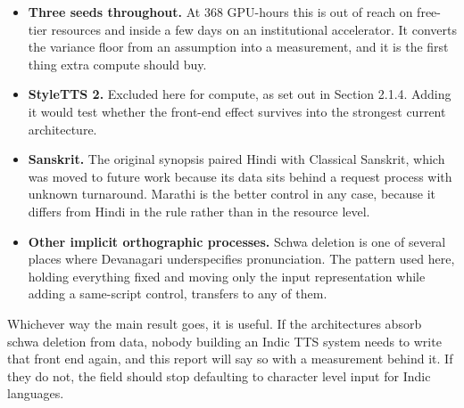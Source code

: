 \documentclass[12pt,a4paper]{article}
\begin{document}
\begin{itemize}[leftmargin=1.6em,itemsep=2pt,topsep=3pt]
  \item \textbf{Three seeds throughout.} At 368 GPU-hours this is out of reach on free-tier resources and inside a few days on an institutional accelerator. It converts the variance floor from an assumption into a measurement, and it is the first thing extra compute should buy.
  \item \textbf{StyleTTS 2.} Excluded here for compute, as set out in Section 2.1.4. Adding it would test whether the front-end effect survives into the strongest current architecture.
  \item \textbf{Sanskrit.} The original synopsis paired Hindi with Classical Sanskrit, which was moved to future work because its data sits behind a request process with unknown turnaround. Marathi is the better control in any case, because it differs from Hindi in the rule rather than in the resource level.
  \item \textbf{Other implicit orthographic processes.} Schwa deletion is one of several places where Devanagari underspecifies pronunciation. The pattern used here, holding everything fixed and moving only the input representation while adding a same-script control, transfers to any of them.
\end{itemize}

Whichever way the main result goes, it is useful. If the architectures absorb schwa deletion from data, nobody building an Indic TTS system needs to write that front end again, and this report will say so with a measurement behind it. If they do not, the field should stop defaulting to character level input for Indic languages.
\end{document}
